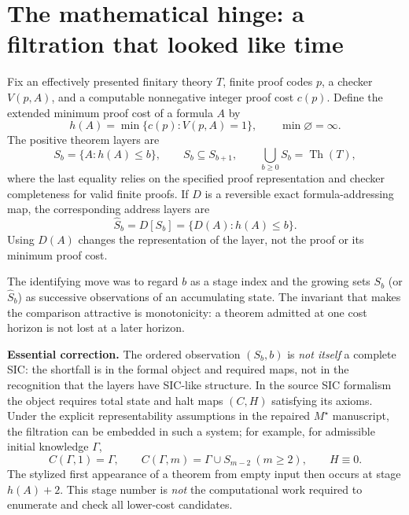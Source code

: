 \documentclass[11pt,letterpaper]{article}
\newcommand{\Ms}{M^{\star}}
\newcommand{\Th}{\operatorname{Th}}
\begin{document}
\section{The mathematical hinge: a filtration that looked like time}
Fix an effectively presented finitary theory $T$, finite proof codes $p$, a checker $V(p,A)$, and a computable nonnegative integer proof cost $c(p)$. Define the extended minimum proof cost of a formula $A$ by
\begin{equation}\label{eq:h}
h(A)=\min\{c(p):V(p,A)=1\}, \qquad \min\varnothing=\infty.
\end{equation}
The positive theorem layers are
\begin{equation}\label{eq:layers}
S_b=\{A:h(A)\leq b\},\qquad S_b\subseteq S_{b+1},\qquad
\bigcup_{b\geq0}S_b=\Th(T),
\end{equation}
where the last equality relies on the specified proof representation and checker completeness for valid finite proofs. If $D$ is a reversible exact formula-addressing map, the corresponding address layers are
\begin{equation}\label{eq:address}
\widehat S_b = D[S_b]=\{D(A):h(A)\leq b\}.
\end{equation}
Using $D(A)$ changes the representation of the layer, not the proof or its minimum proof cost.

The identifying move was to regard $b$ as a stage index and the growing sets $S_b$ (or $\widehat S_b$) as successive observations of an accumulating state. The invariant that makes the comparison attractive is monotonicity: a theorem admitted at one cost horizon is not lost at a later horizon.

\textbf{Essential correction.} The ordered observation $(S_b,b)$ is \emph{not itself} a complete SIC: the shortfall is in the formal object and required maps, not in the recognition that the layers have SIC-like structure. In the source SIC formalism the object requires total state and halt maps $(C,H)$ satisfying its axioms. Under the explicit representability assumptions in the repaired $\Ms$ manuscript, the filtration can be embedded in such a system; for example, for admissible initial knowledge $\Gamma$,
\begin{equation}\label{eq:embed}
C(\Gamma,1)=\Gamma,\qquad C(\Gamma,m)=\Gamma\cup S_{m-2}\ (m\geq2),\qquad H\equiv0.
\end{equation}
The stylized first appearance of a theorem from empty input then occurs at stage $h(A)+2$. This stage number is \emph{not} the computational work required to enumerate and check all lower-cost candidates.
\end{document}
